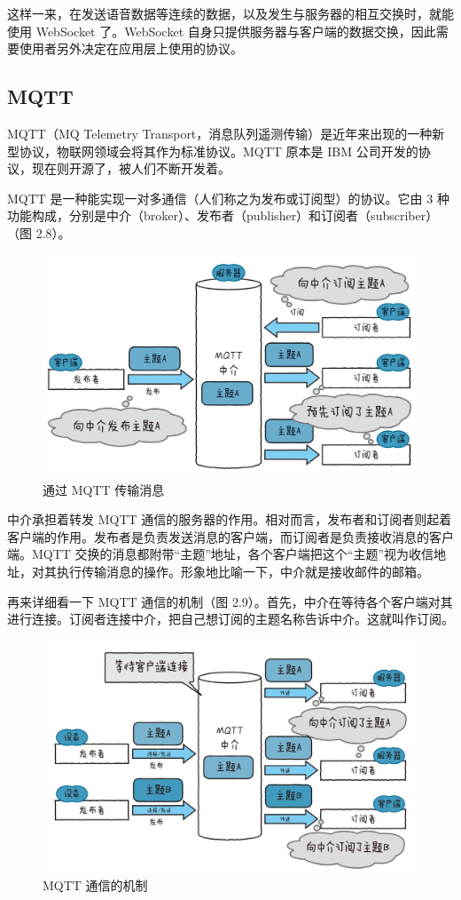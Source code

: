 \documentclass[12pt,UTF8]{ctexbook}
\begin{document}
这样一来，在发送语音数据等连续的数据，以及发生与服务器的相互交换时，就能使用 WebSocket 了。WebSocket 自身只提供服务器与客户端的数据交换，因此需要使用者另外决定在应用层上使用的协议。

\subsection{MQTT}

MQTT（MQ Telemetry Transport，消息队列遥测传输）是近年来出现的一种新型协议，物联网领域会将其作为标准协议。MQTT 原本是 IBM 公司开发的协议，现在则开源了，被人们不断开发着。

MQTT 是一种能实现一对多通信（人们称之为发布或订阅型）的协议。它由 3 种功能构成，分别是中介（broker）、发布者（publisher）和订阅者（subscriber）（图 2.8）。

\begin{figure}[htbp]
	\centering
	\includegraphics[width=1\linewidth]{27}
	\caption{通过 MQTT 传输消息}
	\label{fig:1}
\end{figure}

中介承担着转发 MQTT 通信的服务器的作用。相对而言，发布者和订阅者则起着客户端的作用。发布者是负责发送消息的客户端，而订阅者是负责接收消息的客户端。MQTT 交换的消息都附带“主题”地址，各个客户端把这个“主题”视为收信地址，对其执行传输消息的操作。形象地比喻一下，中介就是接收邮件的邮箱。

再来详细看一下 MQTT 通信的机制（图 2.9）。首先，中介在等待各个客户端对其进行连接。订阅者连接中介，把自己想订阅的主题名称告诉中介。这就叫作订阅。

\begin{figure}[htbp]
	\centering
	\includegraphics[width=1\linewidth]{28}
	\caption{MQTT 通信的机制}
	\label{fig:1}
\end{figure}
\end{document}
